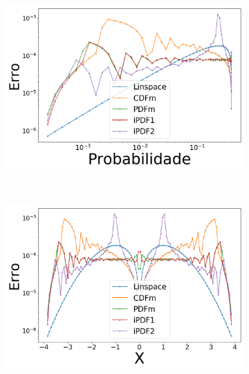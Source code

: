 \begin{figure}[H]
	\centering
	\begin{subfigure}[b]{0.45\textwidth}
		\centering 
		\includegraphics[width=\textwidth]{./figuras/error_normal_nearest_Probabilidade_1}
		\caption{}
		\label{fig:12a}
	\end{subfigure}
	\hfill
	~ %
	\begin{subfigure}[b]{0.45\textwidth}
		\centering 
		\includegraphics[width=\textwidth]{./figuras/error_normal_nearest_X_1}
		\caption{}
		\label{fig:12b}
	\end{subfigure}
	~ %

\end{figure}

